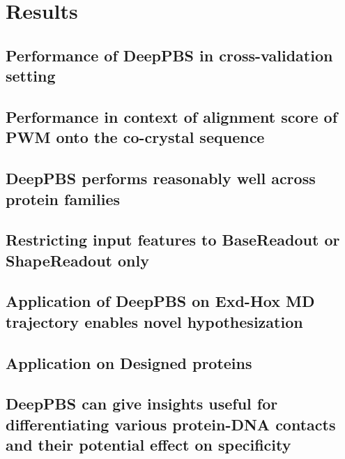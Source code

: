 \section{Results}
\subsection{Performance of DeepPBS in cross-validation setting}
\subsection{Performance in context of alignment score of PWM onto the co-crystal sequence}
\subsection{DeepPBS performs reasonably well across protein families}
\subsection{Restricting input features to BaseReadout or ShapeReadout only}
\subsection{Application of DeepPBS on Exd-Hox MD trajectory enables novel hypothesization}
\subsection{Application on Designed proteins}
\subsection{DeepPBS can give insights useful for differentiating various protein-DNA contacts and
their potential effect on specificity}

